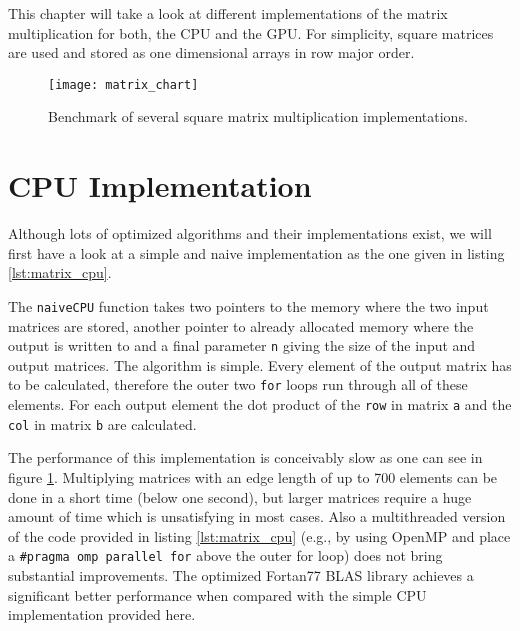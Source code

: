 This chapter will take a look at different implementations of the matrix multiplication for both, the CPU and the GPU. For simplicity, square matrices are used and stored as one dimensional arrays in row major order.

\begin{figure}[!p]
	\centering
	\texttt{[image: matrix\_chart]}
	\caption{Benchmark of several square matrix multiplication implementations.
	}
	\label{fig:matrix_chart}
\end{figure}

\section{CPU Implementation}
\label{sec:matrix_cpu_implementation}

Although lots of optimized algorithms and their implementations exist, we will first have a look at a simple and naive implementation as the one given in listing \ref{lst:matrix_cpu}.



The \lstinline!naiveCPU! function takes two pointers to the memory where the two input matrices are stored, another pointer to already allocated memory where the output is written to and a final parameter \lstinline!n! giving the size of the input and output matrices.
The algorithm is simple. Every element of the output matrix has to be calculated, therefore the outer two \lstinline!for! loops run through all of these elements. For each output element the dot product of the \lstinline!row! in matrix \lstinline!a! and the \lstinline!col! in matrix \lstinline!b! are calculated.

The performance of this implementation is conceivably slow as one can see in figure \ref{fig:matrix_chart}. Multiplying matrices with an edge length of up to 700 elements can be done in a short time (below one second), but larger matrices require a huge amount of time which is unsatisfying in most cases.
Also a multithreaded version of the code provided in listing \ref{lst:matrix_cpu} (e.g., by using OpenMP and place a \lstinline!#pragma omp parallel for! above the outer for loop) does not bring substantial improvements.
The optimized Fortan77 BLAS library \cite{blas_lib} achieves a significant better performance when compared with the simple CPU implementation provided here.


